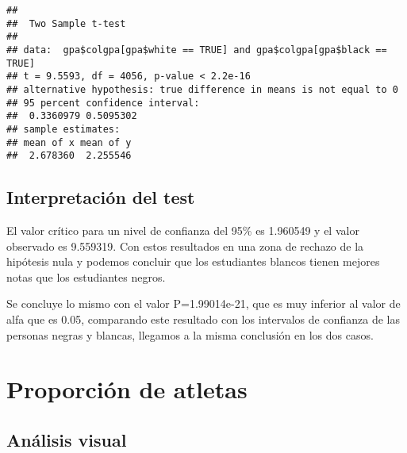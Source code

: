 \documentclass[
]{article}
\newenvironment{Shaded}{\begin{snugshade}}{\end{snugshade}}
\newcommand{\AttributeTok}[1]{\textcolor[rgb]{0.80,0.80,0.80}{#1}}
\newcommand{\DecValTok}[1]{\textcolor[rgb]{0.86,0.86,0.80}{#1}}
\newcommand{\FunctionTok}[1]{\textcolor[rgb]{0.94,0.94,0.56}{#1}}
\newcommand{\NormalTok}[1]{\textcolor[rgb]{0.80,0.80,0.80}{#1}}
\newcommand{\OtherTok}[1]{\textcolor[rgb]{0.94,0.94,0.56}{#1}}
\newcommand{\SpecialCharTok}[1]{\textcolor[rgb]{0.86,0.64,0.64}{#1}}
\newcommand{\StringTok}[1]{\textcolor[rgb]{0.80,0.58,0.58}{#1}}
\begin{document}
\begin{verbatim}
## 
##  Two Sample t-test
## 
## data:  gpa$colgpa[gpa$white == TRUE] and gpa$colgpa[gpa$black == TRUE]
## t = 9.5593, df = 4056, p-value < 2.2e-16
## alternative hypothesis: true difference in means is not equal to 0
## 95 percent confidence interval:
##  0.3360979 0.5095302
## sample estimates:
## mean of x mean of y 
##  2.678360  2.255546
\end{verbatim}

\hypertarget{interpretaciuxf3n-del-test-1}{%
\subsection{Interpretación del
test}\label{interpretaciuxf3n-del-test-1}}

El valor crítico para un nivel de confianza del 95\% es 1.960549 y el
valor observado es 9.559319. Con estos resultados en una zona de rechazo
de la hipótesis nula y podemos concluir que los estudiantes blancos
tienen mejores notas que los estudiantes negros.

Se concluye lo mismo con el valor P=1.99014e-21, que es muy inferior al
valor de alfa que es 0.05, comparando este resultado con los intervalos
de confianza de las personas negras y blancas, llegamos a la misma
conclusión en los dos casos.

\hypertarget{proporciuxf3n-de-atletas}{%
\section{Proporción de atletas}\label{proporciuxf3n-de-atletas}}

\hypertarget{anuxe1lisis-visual-3}{%
\subsection{Análisis visual}\label{anuxe1lisis-visual-3}}

\begin{Shaded}
\end{Shaded}
\end{document}
